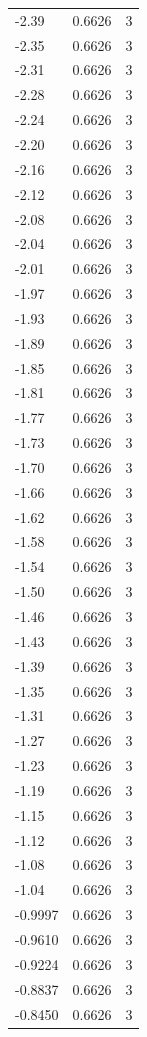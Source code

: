 \begin{longtable}{lrr}
  -2.39 & 0.6626 & 3 \\
  -2.35 & 0.6626 & 3 \\
  -2.31 & 0.6626 & 3 \\
  -2.28 & 0.6626 & 3 \\
  -2.24 & 0.6626 & 3 \\
  -2.20 & 0.6626 & 3 \\
  -2.16 & 0.6626 & 3 \\
  -2.12 & 0.6626 & 3 \\
  -2.08 & 0.6626 & 3 \\
  -2.04 & 0.6626 & 3 \\
  -2.01 & 0.6626 & 3 \\
  -1.97 & 0.6626 & 3 \\
  -1.93 & 0.6626 & 3 \\
  -1.89 & 0.6626 & 3 \\
  -1.85 & 0.6626 & 3 \\
  -1.81 & 0.6626 & 3 \\
  -1.77 & 0.6626 & 3 \\
  -1.73 & 0.6626 & 3 \\
  -1.70 & 0.6626 & 3 \\
  -1.66 & 0.6626 & 3 \\
  -1.62 & 0.6626 & 3 \\
  -1.58 & 0.6626 & 3 \\
  -1.54 & 0.6626 & 3 \\
  -1.50 & 0.6626 & 3 \\
  -1.46 & 0.6626 & 3 \\
  -1.43 & 0.6626 & 3 \\
  -1.39 & 0.6626 & 3 \\
  -1.35 & 0.6626 & 3 \\
  -1.31 & 0.6626 & 3 \\
  -1.27 & 0.6626 & 3 \\
  -1.23 & 0.6626 & 3 \\
  -1.19 & 0.6626 & 3 \\
  -1.15 & 0.6626 & 3 \\
  -1.12 & 0.6626 & 3 \\
  -1.08 & 0.6626 & 3 \\
  -1.04 & 0.6626 & 3 \\
  -0.9997 & 0.6626 & 3 \\
  -0.9610 & 0.6626 & 3 \\
  -0.9224 & 0.6626 & 3 \\
  -0.8837 & 0.6626 & 3 \\
  -0.8450 & 0.6626 & 3 \\

\end{longtable}
